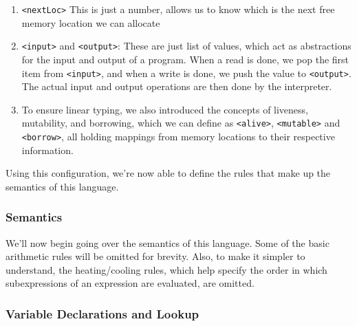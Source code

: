\documentclass[review,twocolumn]{sigplanconf}
\begin{document}
\begin{enumerate}
  \item \verb!<nextLoc>! This is just a number, allows us to know which is the next free memory location we can allocate
  \item \verb!<input>! and \verb!<output>!: These are just list of values, which act as abstractions for the input and output of a program. When a read is done, we pop the first item from \verb!<input>!, and when a write is done, we push the value to \verb!<output>!. The actual input and output operations are then done by the interpreter.
  \item To ensure linear typing, we also introduced the concepts of liveness, mutability, and borrowing, which we can define as \verb!<alive>!, \verb!<mutable>! and \verb!<borrow>!, all holding mappings from memory locations to their respective information.
\end{enumerate}

Using this configuration, we're now able to define the rules that make up the semantics of this language.
\subsubsection{Semantics}

We'll now begin going over the semantics of this language. Some of the basic arithmetic rules will be omitted for brevity. Also, to make it simpler to understand, the heating/cooling rules, which help specify the order in which subexpressions of an expression are evaluated, are omitted.

\subsubsection*{Variable Declarations and Lookup}
\end{document}
